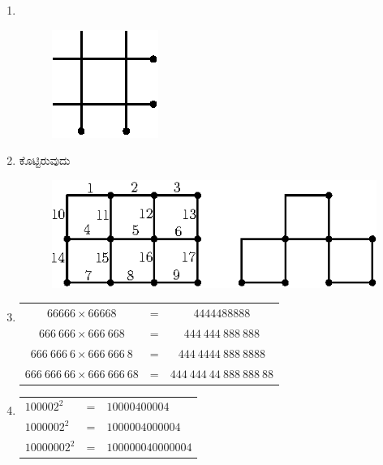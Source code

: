 \begin{enumerate}
\item 
~

\begin{figure}[H]
\centering
\includegraphics{images/chap9/ans14.eps}

\end{figure}


\item ಕೊಟ್ಟಿರುವುದು 
\begin{figure}[H]
\centering
\includegraphics[scale=1.1]{images/chap9/ans15.eps}

\hspace{4cm}
\end{figure}


\item 

\begin{tabular}[t]{ccc}
$66666\times 66668$ & = & $4444488888$\\
$666~666\times 666~668$ & = & $444~444~888~888$\\
$666~666~6\times 666~666~8$ & = & $444~4444~888~8888$\\
$666~666~66\times 666~666~68$ & = & $444~444~44~888~888~88$\\
\end{tabular}

\smallskip
\item 

\begin{tabular}[t]{lll}
$100002^{2}$ & = & $10000400004$\\
$1000002^{2}$ & = & $1000004000004$\\
$10000002^{2}$ & = & $100000040000004$\\
\end{tabular}


\end{enumerate}
